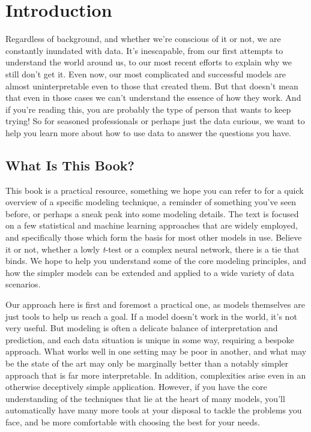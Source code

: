 \documentclass[
  letterpaper,
]{krantz}
\begin{document}
\chapter{Introduction}\label{introduction}


Regardless of background, and whether we're conscious of it or not, we
are constantly inundated with data. It's inescapable, from our first
attempts to understand the world around us, to our most recent efforts
to explain why we still don't get it. Even now, our most complicated and
successful models are almost uninterpretable even to those that created
them. But that doesn't mean that even in those cases we can't understand
the essence of how they work. And if you're reading this, you are
probably the type of person that wants to keep trying! So for seasoned
professionals or perhaps just the data curious, we want to help you
learn more about how to use data to answer the questions you have.

\section{What Is This Book?}\label{what-is-this-book}

This book is a practical resource, something we hope you can refer to
for a quick overview of a specific modeling technique, a reminder of
something you've seen before, or perhaps a sneak peak into some modeling
details. The text is focused on a few statistical and machine learning
approaches that are widely employed, and specifically those which form
the basis for most other models in use. Believe it or not, whether a
lowly \emph{t}-test or a complex neural network, there is a tie that
binds. We hope to help you understand some of the core modeling
principles, and how the simpler models can be extended and applied to a
wide variety of data scenarios.

Our approach here is first and foremost a practical one, as models
themselves are just tools to help us reach a goal. If a model doesn't
work in the world, it's not very useful. But modeling is often a
delicate balance of interpretation and prediction, and each data
situation is unique in some way, requiring a bespoke approach. What
works well in one setting may be poor in another, and what may be the
state of the art may only be marginally better than a notably simpler
approach that is far more interpretable. In addition, complexities arise
even in an otherwise deceptively simple application. However, if you
have the core understanding of the techniques that lie at the heart of
many models, you'll automatically have many more tools at your disposal
to tackle the problems you face, and be more comfortable with choosing
the best for your needs.
\end{document}
